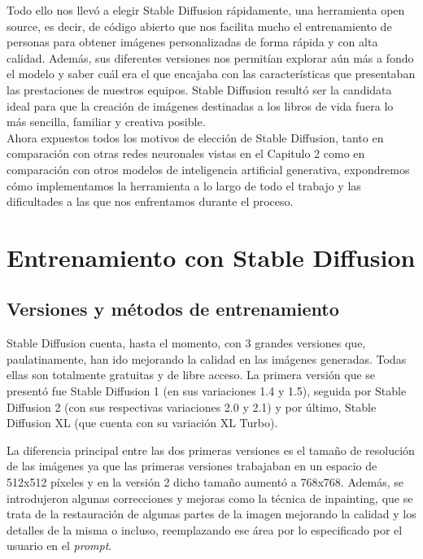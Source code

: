 Todo ello nos llevó a elegir Stable Diffusion rápidamente, una herramienta open source, es decir, de código abierto que nos facilita mucho el entrenamiento de personas para obtener imágenes personalizadas de forma rápida y con alta calidad. Además, sus diferentes versiones nos permitían explorar aún más a fondo el modelo y saber cuál era el que encajaba con las características que presentaban las prestaciones de nuestros equipos. Stable Diffusion resultó ser la candidata ideal para que la creación de imágenes destinadas a  los libros de vida fuera lo más sencilla, familiar y creativa posible. \\

Ahora expuestos todos los motivos de elección de Stable Diffusion, tanto en comparación con otras redes neuronales vistas en el Capitulo 2 como en comparación con otros modelos de inteligencia artificial generativa, expondremos cómo implementamos la herramienta a lo largo de todo el trabajo y las dificultades a las que nos enfrentamos durante el proceso. \\

\section{Entrenamiento con Stable Diffusion}

\subsection{Versiones y métodos de entrenamiento}

Stable Diffusion cuenta, hasta el momento, con 3 grandes versiones que, paulatinamente, han ido mejorando la calidad en las imágenes generadas. Todas ellas son totalmente gratuitas y de libre acceso. La primera versión que se presentó fue Stable Diffusion 1 (en sus variaciones 1.4 y 1.5), seguida por Stable Diffusion 2 (con sus respectivas variaciones 2.0 y 2.1) y por último, Stable Diffusion XL (que cuenta con su variación XL Turbo). 

La diferencia principal entre las dos primeras versiones es el tamaño de resolución de las imágenes ya que las primeras versiones trabajaban en un espacio de 512x512 píxeles y en la versión 2 dicho tamaño aumentó a 768x768. Además, se introdujeron algunas correcciones y mejoras como la técnica de inpainting, que se trata de la restauración de algunas partes de la imagen mejorando la calidad y los detalles de la misma o incluso, reemplazando ese área por lo especificado por el usuario en el \textit{prompt}.

